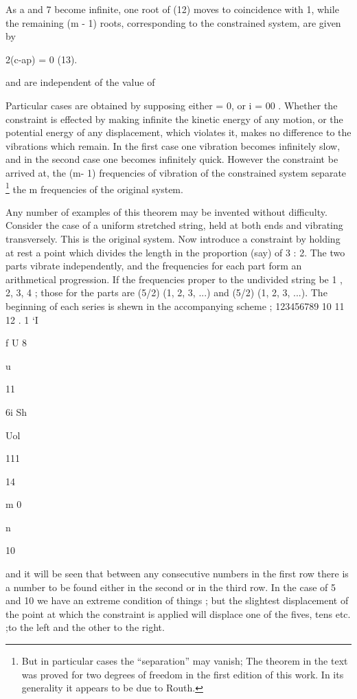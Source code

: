 As a and 7 become infinite, one root of (12) moves to coincidence with
1, while the remaining (m - 1) roots, corresponding to the constrained
system, are given by

 2(c-ap) = 0 (13).

and are independent of the value of

Particular cases are obtained by supposing either = 0, or i   = 00 .
Whether the constraint is effected by making infinite the kinetic
energy of any motion, or the potential energy of any displacement,
which violates it, makes no difference to the vibrations which remain.
In the first case one vibration becomes infinitely slow, and in the
second case one becomes infinitely quick.  However the constraint be
arrived at, the (m- 1) frequencies of vibration of the constrained
system separate \footnote{But in particular cases the  ``separation''
may vanish; The theorem in the text was proved for two degrees of
freedom in the first edition of this work. In its generality it appears
to be due to Routh.} the m frequencies of the original system.

Any number of examples of this theorem may be invented without
difficulty. Consider the case of a uniform stretched string, held at
both ends and vibrating transversely. This is the original system. Now
introduce a constraint by holding at rest a point which divides the
length in the proportion (say) of 3 : 2.  The two parts vibrate
independently, and the frequencies for each part form an arithmetical
progression. If the frequencies proper to the undivided string be 1 ,
2, 3, 4 ; those for the parts are
(5/2) (1, 2, 3, ...) and (5/2) (1, 2, 3, ...).
The beginning of each series is shewn in the accompanying
scheme ; 123456789 10 11 12 . 1 ‘I

f U 8

u

 11

6i Sh

Uol


111

 14

m 0

n

10

and it will be seen that between any consecutive numbers in the first
row there is a number to be found either in the second or in the third
row. In the case of 5 and 10 we have an extreme condition of things ;
but the slightest displacement of the point at which the constraint is
applied will displace one of the fives, tens etc. ;to the left and the
other to the right.

